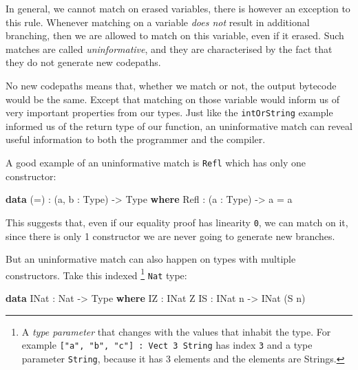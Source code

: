 \documentclass[
]{article}
\newenvironment{Shaded}{}{}
\newcommand{\DataTypeTok}[1]{\textcolor[rgb]{0.56,0.13,0.00}{#1}}
\newcommand{\KeywordTok}[1]{\textcolor[rgb]{0.00,0.44,0.13}{\textbf{#1}}}
\newcommand{\NormalTok}[1]{#1}
\newcommand{\OperatorTok}[1]{\textcolor[rgb]{0.40,0.40,0.40}{#1}}
\newcommand{\OtherTok}[1]{\textcolor[rgb]{0.00,0.44,0.13}{#1}}
\begin{document}
In general, we cannot match on erased variables, there is however an
exception to this rule. Whenever matching on a variable \emph{does not}
result in additional branching, then we are allowed to match on this
variable, even if it erased. Such matches are called
\emph{uninformative}, and they are characterised by the fact that they
do not generate new codepaths.

No new codepaths means that, whether we match or not, the output
bytecode would be the same. Except that matching on those variable would
inform us of very important properties from our types. Just like the
\texttt{intOrString} example informed us of the return type of our
function, an uninformative match can reveal useful information to both
the programmer and the compiler.

A good example of an uninformative match is \texttt{Refl} which has only
one constructor:

\begin{Shaded}
\begin{Highlighting}[]
\KeywordTok{data}\NormalTok{ (}\OtherTok{=}\NormalTok{) }\OperatorTok{:}\NormalTok{ (a, b }\OperatorTok{:} \DataTypeTok{Type}\NormalTok{) }\OtherTok{{-}\textgreater{}} \DataTypeTok{Type} \KeywordTok{where}
  \DataTypeTok{Refl} \OperatorTok{:}\NormalTok{ (a }\OperatorTok{:} \DataTypeTok{Type}\NormalTok{) }\OtherTok{{-}\textgreater{}}\NormalTok{ a }\OtherTok{=}\NormalTok{ a}
\end{Highlighting}
\end{Shaded}

This suggests that, even if our equality proof has linearity \texttt{0},
we can match on it, since there is only 1 constructor we are never going
to generate new branches.

But an uninformative match can also happen on types with multiple
constructors. Take this indexed \footnote{A \emph{type parameter} that
  changes with the values that inhabit the type. For example
  \texttt{{[}"a",\ "b",\ "c"{]}\ :\ Vect\ 3\ String} has index
  \texttt{3} and a type parameter \texttt{String}, because it has 3
  elements and the elements are Strings.} \texttt{Nat} type:

\begin{Shaded}
\begin{Highlighting}[]
\KeywordTok{data} \DataTypeTok{INat} \OperatorTok{:} \DataTypeTok{Nat} \OtherTok{{-}\textgreater{}} \DataTypeTok{Type} \KeywordTok{where}
  \DataTypeTok{IZ} \OperatorTok{:} \DataTypeTok{INat} \DataTypeTok{Z}
  \DataTypeTok{IS} \OperatorTok{:} \DataTypeTok{INat}\NormalTok{ n }\OtherTok{{-}\textgreater{}} \DataTypeTok{INat}\NormalTok{ (}\DataTypeTok{S}\NormalTok{ n)}
\end{Highlighting}
\end{Shaded}
\end{document}
